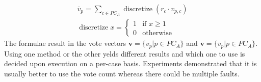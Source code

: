 \begin{equation}
  \label{eq:vote_count}
  \begin{gathered}
  \bar v_p=\sum\limits_{c\in PC_A}\operatorname{discretize}{(r_c\cdot v_{p,c})}\\
  \operatorname{discretize}{x}=\begin{cases}
      1 & \text{if } x\geq 1\\
      0 & \text{otherwise}
    \end{cases}
  \end{gathered}
\end{equation}
The formulae result in the vote vectors $\bm v=\{v_p|p\in PC_A\}$ and $\bm{\bar v}=\{\bar v_p|p\in PC_A\}$.
Using one method or the other yelds different results and which one to use is decided upon execution on a per-case basis. Experiments \cite{semantic_diagnoser} demonstrated that it is usually better to use the vote count whereas there could be multiple faults.
